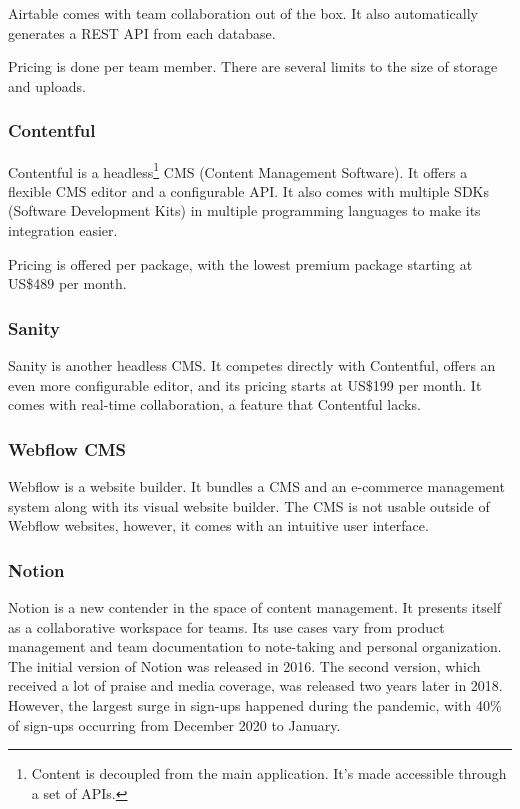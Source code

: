 Airtable comes with team collaboration out of the box. It also
automatically generates a REST API from each database.

Pricing is done per team member. There are several limits to the size of
storage and uploads.

\subsubsection{Contentful}


Contentful is a headless\footnote{Content is decoupled from the main
	application. It's made accessible through a set of APIs.} CMS (Content
Management Software). It offers a flexible CMS editor and a configurable
API. It also comes with multiple SDKs (Software Development Kits) in
multiple programming languages to make its integration easier.

Pricing is offered per package, with the lowest premium package starting
at US\$489 per month.

\subsubsection{Sanity}


Sanity is another headless CMS. It competes directly with Contentful,
offers an even more configurable editor, and its pricing starts at
US\$199 per month. It comes with real-time collaboration, a feature that
Contentful lacks.

\subsubsection{Webflow CMS}


Webflow is a website builder. It bundles a CMS and an e-commerce
management system along with its visual website builder. The CMS is not
usable outside of Webflow websites, however, it comes with an intuitive
user interface.

\subsubsection{Notion}


Notion is a new contender in the space of content management. It
presents itself as a collaborative workspace for teams. Its use cases
vary from product management and team documentation to note-taking and
personal organization. The initial version of Notion was released in
2016. The second version, which received a lot of praise and media
coverage, was released two years later in 2018. However, the largest
surge in sign-ups happened during the pandemic, with 40\% of sign-ups
occurring from December 2020 to January.

